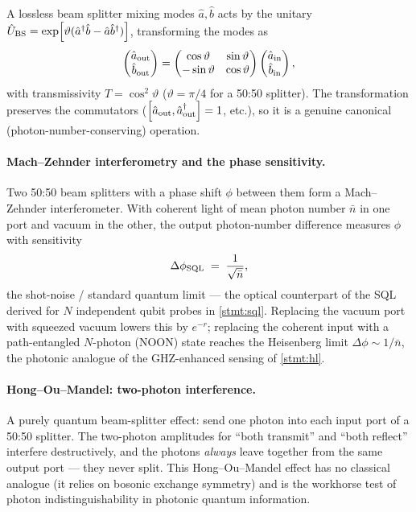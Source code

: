 \begin{statement}
\label{stmt:beam-splitter}
A lossless beam splitter mixing modes $\hat a,\hat b$ acts by the
unitary $\hat{U}_{\rm BS}=\exp[\vartheta(\hat a^\dagger\hat b-\hat a\hat b^\dagger)]$,
transforming the modes as
\begin{equation}
\label{eq:beam-splitter}
\begin{pmatrix}\hat a_{\rm out}\\ \hat b_{\rm out}\end{pmatrix}
=\begin{pmatrix}\cos\vartheta & \sin\vartheta\\ -\sin\vartheta & \cos\vartheta\end{pmatrix}
\begin{pmatrix}\hat a_{\rm in}\\ \hat b_{\rm in}\end{pmatrix},
\end{equation}
with transmissivity $T=\cos^2\vartheta$ ($\vartheta=\pi/4$ for a
50:50 splitter). The transformation preserves the commutators
($\comm{\hat a_{\rm out}}{\hat a_{\rm out}^\dagger}=1$, etc.), so it
is a genuine canonical (photon-number-conserving) operation.
\end{statement}

\paragraph{Mach--Zehnder interferometry and the phase sensitivity.}
Two 50:50 beam splitters with a phase shift $\phi$ between them form
a Mach--Zehnder interferometer. With coherent light of mean photon
number $\bar n$ in one port and vacuum in the other, the output
photon-number difference measures $\phi$ with sensitivity
\begin{equation}
\label{eq:mz-sensitivity}
\Delta\phi_{\rm SQL} \;=\; \frac{1}{\sqrt{\bar n}},
\end{equation}
the shot-noise / standard quantum limit --- the optical counterpart
of the SQL derived for $N$ independent qubit probes in
\cref{stmt:sql}. Replacing the vacuum port with squeezed vacuum
lowers this by $e^{-r}$; replacing the coherent input with a
path-entangled $N$-photon (NOON) state reaches the Heisenberg limit
$\Delta\phi\sim1/\bar n$, the photonic analogue of the
GHZ-enhanced sensing of \cref{stmt:hl}.

\paragraph{Hong--Ou--Mandel: two-photon interference.}
A purely quantum beam-splitter effect: send one photon into each
input port of a 50:50 splitter. The two-photon amplitudes for
``both transmit'' and ``both reflect'' interfere destructively, and
the photons \emph{always} leave together from the same output port
--- they never split. This Hong--Ou--Mandel effect has no classical
analogue (it relies on bosonic exchange symmetry) and is the
workhorse test of photon indistinguishability in photonic quantum
information.


